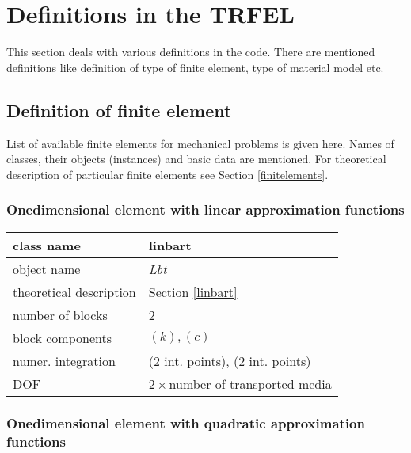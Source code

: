 \section{Definitions in the TRFEL}

This section deals with various definitions in the code. There are mentioned definitions
like definition of type of finite element, type of material model etc.


\subsection{Definition of finite element}

List of available finite elements for mechanical problems is given here. Names of classes, their objects
(instances) and basic data are mentioned. For theoretical description of particular finite elements
see Section \ref{finitelements}.


\subsubsection{Onedimensional element with linear approximation functions}

\begin{center}
\begin{tabular}{|l|l|}
\hline
class name & {\sf linbart}
\\ \hline
object name & {\it Lbt}
\\ \hline
theoretical description & Section \ref{linbart}
\\ \hline
number of blocks & 2
\\ \hline
block components & $(k), (c)$
\\ \hline
numer. integration & (2 int. points), (2 int. points)
\\ \hline
DOF & $2 \times$number of transported media
\\ \hline
\end{tabular}
\end{center}



\subsubsection{Onedimensional element with quadratic approximation functions}

